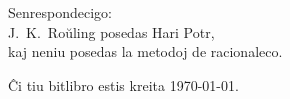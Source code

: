 \newpage
\vspace*{4cm}
\begin{center}
Senrespondecigo:\\J.~K.~Roŭling posedas Hari Potr,\\kaj neniu posedas la metodoj de racionaleco.
\end{center}

\vfill
Ĉi tiu bitlibro estis kreita \today{}.
